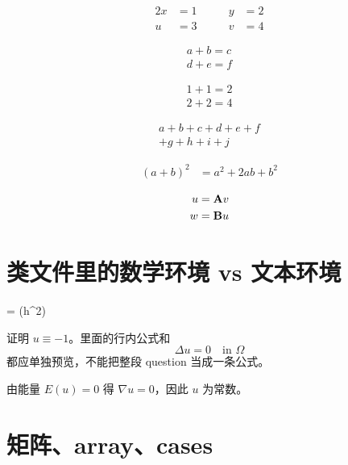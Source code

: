 \documentclass{silkmath-fixture}
\begin{document}
\begin{alignat}{2}
  x &= 1 &\qquad y &= 2 \\
  u &= 3 &\qquad v &= 4
\end{alignat}

\begin{gather}
  a+b=c \\
  d+e=f
\end{gather}

\begin{gather*}
  1+1=2 \\
  2+2=4
\end{gather*}

\begin{multline}
  a+b+c+d+e+f \\
  +g+h+i+j
\end{multline}

\begin{equation}
\begin{split}
  (a+b)^2
  &= a^2+2ab+b^2
\end{split}
\end{equation}

\begin{equation}
\begin{aligned}
  u &= \mathbf{A} v \\
  w &= \mathbf{B} u
\end{aligned}
\end{equation}

\section{类文件里的数学环境 vs 文本环境}

\begin{eqmath}
   = \Ocal(h^2)
\end{eqmath}

\begin{question}
  证明 $u\equiv-1$。里面的行内公式和
  \[
    \Delta u = 0 \quad\text{in }\Omega
  \]
  都应单独预览，不能把整段 question 当成一条公式。
\end{question}

\begin{solution}
  由能量 $E(u)=0$ 得 $\nabla u=0$，因此 $u$ 为常数。
\end{solution}

\section{矩阵、array、cases}
\end{document}

